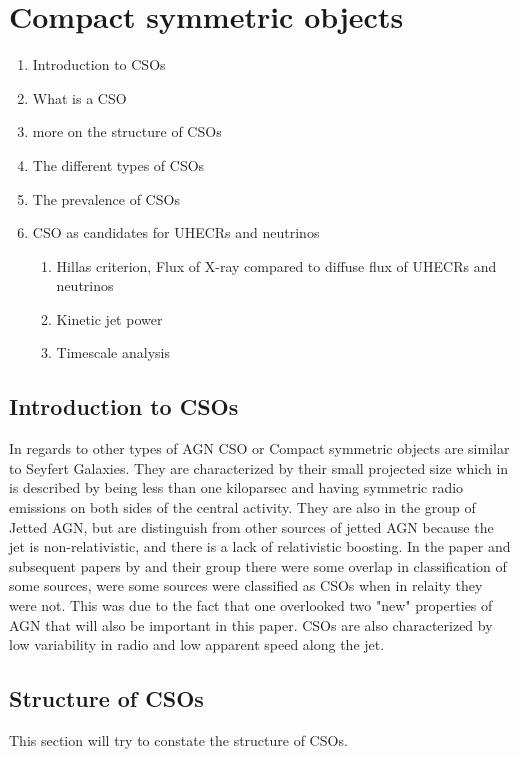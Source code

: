 \section{Compact symmetric objects}
\begin{enumerate}
    \item Introduction to CSOs
    \item What is a CSO
    \item more on the structure of CSOs
    \item The different types of CSOs
    \item The prevalence of CSOs 
    \item CSO as candidates for UHECRs and neutrinos
    \begin{enumerate}
        
       
        \item Hillas criterion, Flux of X-ray compared to diffuse flux of UHECRs and neutrinos 
        \item Kinetic jet power
        \item Timescale analysis
    \end{enumerate}
\end{enumerate}

\subsection*{Introduction to CSOs}
In regards to other types of AGN CSO or Compact symmetric objects are similar to Seyfert Galaxies. They are characterized by their small projected size 
which in \cite{kiehlmann2023compact} is described by being less than one kiloparsec and having symmetric radio emissions on both sides of the central activity. They are also in the group
of Jetted AGN, but are distinguish from other sources of jetted AGN because the jet is non-relativistic, and there is a lack of relativistic boosting. In the paper and subsequent 
papers by \cite{kiehlmann2023compact} and their group there were some overlap in classification of some sources, were some sources were classified as CSOs when in relaity they were not. 
This was due to the fact that one overlooked two "new" properties of AGN that will also be important in this paper. CSOs are also characterized by low variability in radio and low 
apparent speed along the jet. 

\subsection{Structure of CSOs}
This section will try to constate the structure of CSOs. 



